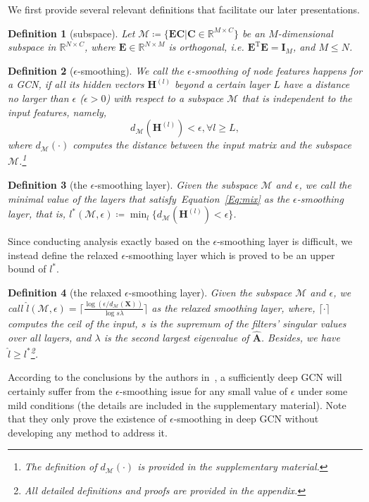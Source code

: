 \documentclass{article}
\newtheorem{definition}{Definition}
\def\Eqref#1{Equation~\ref{#1}}
\def\mA{{\bm{A}}}
\def\mC{{\bm{C}}}
\def\mE{{\bm{E}}}
\def\mH{{\bm{H}}}
\def\mI{{\bm{I}}}
\def\mX{{\bm{X}}}
\def\gM{{\mathcal{M}}}
\newcommand{\R}{\mathbb{R}}
\begin{document}
We first provide several relevant definitions that facilitate our later presentations.
\begin{definition}[subspace]
Let $\gM\coloneqq\{\mE\mC|\mC\in\R^{M\times C}\}$ be an $M$-dimensional subspace in $\R^{N\times C}$, where $\mE\in\R^{N\times M}$ is orthogonal, \emph{i.e.} $\mE^{\mathrm{T}}\mE=\mI_M$, and $M\leq N$.
\end{definition}
\begin{definition}[$\epsilon$-smoothing]
We call the $\epsilon$-smoothing of node features happens for a GCN, if all its hidden vectors $\mH^{(l)}$ beyond a certain layer $L$ have a distance no larger than $\epsilon$ ($\epsilon>0$) with respect to a subspace $\gM$ that is independent to the input features, namely,
\begin{equation}
\label{Eq:mix}
d_{\gM}(\mH^{(l)}) < \epsilon, \forall l\geq L,
\end{equation}
where $d_{\gM}(\cdot)$ computes the distance between the input matrix and the subspace $\gM$.\footnote{The definition of $d_{\gM}(\cdot)$ is provided in the supplementary material.}
\end{definition}
\begin{definition}[the $\epsilon$-smoothing layer]
Given the subspace $\gM$ and $\epsilon$, we call the minimal value of the layers that satisfy~\Eqref{Eq:mix} as the $\epsilon$-smoothing layer, that is, $l^{\ast}(\gM, \epsilon)\coloneqq\min_{l}\{d_{\gM}(\mH^{(l)}) < \epsilon\}$.
\end{definition}

Since conducting analysis exactly based on the $\epsilon$-smoothing layer is difficult, we instead define the relaxed $\epsilon$-smoothing layer which is proved to be an upper bound of $l^{\ast}$.
\begin{definition}[the relaxed $\epsilon$-smoothing layer] 
Given the subspace $\gM$ and $\epsilon$, we call $\hat{l}(\gM,\epsilon)=\lceil\frac{\log(\epsilon/d_{\gM}(\mX))}{\log s\lambda}\rceil$ as the relaxed smoothing layer, where, $\lceil \cdot \rceil$ computes the ceil of the input, $s$ is the supremum of the filters' singular values over all layers, and $\lambda$ is the second largest eigenvalue of $\hat{\mA}$. Besides, we have $\hat{l}\geq l^{\ast}$\footnote{ All detailed definitions and proofs are provided in the appendix.}.
\end{definition}


According to the conclusions by the authors in~\citet{oono2019asymptotic}, a sufficiently deep GCN will certainly suffer from the $\epsilon$-smoothing issue for any small value of $\epsilon$ under some mild conditions (the details are included in the supplementary material). Note that they only prove the existence of $\epsilon$-smoothing in deep GCN without developing any method to address it.
\end{document}
